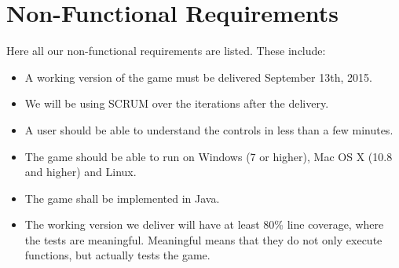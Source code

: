 \chapter{Non-Functional Requirements}

Here all our non-functional requirements are listed. These include: 

\begin{itemize}
\itemsep0em
	\item A working version of the game must be delivered September 13th, 2015.
	\item We will be using SCRUM over the iterations after the delivery.
	\item A user should be able to understand the controls in less than a few minutes.
	\item The game should be able to run on Windows (7 or higher), Mac OS X (10.8 and higher) and Linux.
	\item The game shall be implemented in Java. 
	\item The working version we deliver will have at least 80\% line coverage, where the tests are meaningful. Meaningful means that they do not only execute functions, but actually tests the game.
\end{itemize}